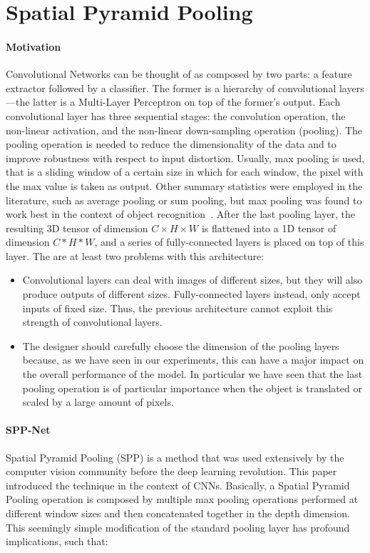 \documentclass[../main.tex]{subfiles}
\begin{document}
    \section{Spatial Pyramid Pooling}
    \paragraph{Motivation}
    Convolutional Networks can be thought of as composed by two parts: a feature extractor followed by a classifier.
    The former is a hierarchy of convolutional layers---the latter is a Multi-Layer Perceptron on top of the former's output.
    Each convolutional layer has three sequential stages: the convolution operation, the non-linear activation, and the non-linear
    down-sampling operation (pooling).
    The pooling operation is needed to reduce the dimensionality of the data and to improve robustness with respect to input distortion.
    Usually, max pooling is used, that is a sliding window of a certain size in which for each window,
	the pixel with the max value is taken as output.
	Other summary statistics were employed in the literature, such as average pooling or sum pooling, but max pooling was found to
	work best in the context of object recognition~\cite{maxpooling}.
    After the last pooling layer, the resulting 3D tensor of dimension $C \times H \times W$ is flattened into a 1D tensor of dimension $C * H * W$,
    and a series of fully-connected layers is placed on top of this layer. The are at least two problems with this architecture:
    \begin{itemize}
        \item Convolutional layers can deal with images of different sizes, but they will also produce outputs of different sizes. Fully-connected
            layers instead, only accept inputs of fixed size. Thus, the previous architecture cannot exploit this strength of convolutional layers.
        \item The designer should carefully choose the dimension of the pooling layers because, as we have seen in our experiments, this can have
            a major impact on the overall performance of the model. In particular we have seen that the last pooling operation is of particular
            importance when the object is translated or scaled by a large amount of pixels.
    \end{itemize}
    
    \paragraph{SPP-Net}
    Spatial Pyramid Pooling (SPP) is a method that was used extensively by the computer vision community before the deep learning revolution.
    This paper~\cite{sppooling} introduced the technique in the context of CNNs. Basically, a Spatial Pyramid Pooling operation
    is composed by multiple max pooling operations performed at different window sizes and then concatenated together in the depth dimension.
    This seemingly simple modification of the standard pooling layer has profound implications, such that:
\end{document}
